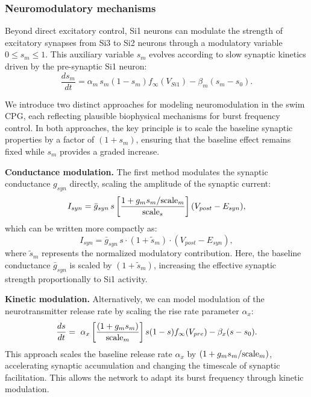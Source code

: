 \documentclass[nofootinbib,aip,amsmath,amssymb,preprint,twocolumn,floatfix,10pt]{revtex4-2}
\begin{document}
\subsubsection{Neuromodulatory mechanisms}

Beyond direct excitatory control, Si1 neurons can modulate the strength of excitatory synapses from Si3 to Si2 neurons through a modulatory variable $0 \le s_m \le 1$. This auxiliary variable $s_m$ evolves according to slow synaptic kinetics driven by the pre-synaptic Si1 neuron:
\begin{equation}
\frac{ds_m}{dt} = \alpha_m\, s_m (1 - s_m) f_{\infty}(V_{Si1}) - \beta_m (s_m - s_0).
\end{equation}

We introduce two distinct approaches for modeling neuromodulation in the swim CPG, each reflecting plausible biophysical mechanisms for burst frequency control. In both approaches, the key principle is to scale the baseline synaptic properties by a factor of $(1 + s_m)$, ensuring that the baseline effect remains fixed while $s_m$ provides a graded increase.

\textbf{Conductance modulation.} The first method modulates the synaptic conductance $g_{syn}$ directly, scaling the amplitude of the synaptic current:
\begin{equation}
I_{syn} = {\bar g}_{syn}\,s \left [ \frac{ 1+g_m s_m/{\rm scale}_m}{{\rm scale}_s} \right ] (V_{post}-E_{syn}),
\end{equation}
which can be written more compactly as:
\begin{equation}
I_{syn} = {\bar g}_{syn}\,s \cdot \left (1+{\tilde s_m} \right ) \cdot  (V_{post}-E_{syn}),
\end{equation}
where $\tilde s_m$ represents the normalized modulatory contribution. Here, the baseline conductance ${\bar g}_{syn}$ is scaled by $(1+{\tilde s_m})$, increasing the effective synaptic strength proportionally to Si1 activity.

\textbf{Kinetic modulation.} Alternatively, we can model modulation of the neurotransmitter release rate by scaling the rise rate parameter $\alpha_x$:
\begin{equation}
\frac{ds}{dt} = \ \alpha_x \left [ \frac{(1 + g_m s_m)}{{\rm scale}_m} \right ]  s (1 - s) f_{\infty}(V_{pre}) - \beta_x (s - s_0).
\end{equation}
This approach scales the baseline release rate $\alpha_x$ by $(1 + g_m s_m/{\rm scale}_m)$, accelerating synaptic accumulation and changing the timescale of synaptic facilitation. This allows the network to adapt its burst frequency through kinetic modulation.
\end{document}
